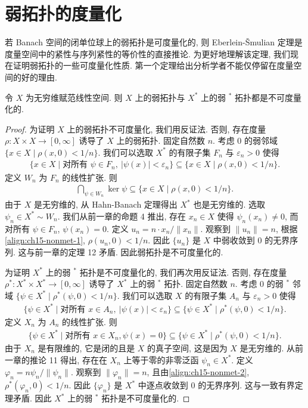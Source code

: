 \documentclass[../../main.tex]{subfiles}
\begin{document}
\section{弱拓扑的度量化}\label{section:ch15-metrizability}

若 Banach 空间的闭单位球上的弱拓扑是可度量化的, 则 Eberlein-\v{S}mulian 定理是度量空间中的紧性与序列紧性的等价性的直接推论. 为更好地理解该定理, 我们现在证明弱拓扑的一些可度量化性质. 第一个定理给出分析学者不能仅停留在度量空间的好的理由.

\begin{theorem}\label{theorem:ch15-nonmetrizable}
令 $X$ 为无穷维赋范线性空间. 则 $X$ 上的弱拓扑与 $X^{*}$ 上的弱 $^{*}$ 拓扑都是不可度量化的.
\end{theorem}

\begin{proof}
为证明 $X$ 上的弱拓扑不可度量化, 我们用反证法. 否则, 存在度量 $\rho:X\times X\to[0,\infty]$ 诱导了 $X$ 上的弱拓扑. 固定自然数 $n$. 考虑 $0$ 的弱邻域 $\{x\in X\mid\rho(x,0)<1/n\}$. 我们可以选取 $X^{*}$ 的有限子集 $F_{n}$ 与 $\varepsilon_{n}>0$ 使得
\begin{align*}
\{x\in X\mid\text{对所有 }\psi\in F_{n},\ |\psi(x)|<\varepsilon_{n}\}\subseteq\{x\in X\mid\rho(x,0)<1/n\}.
\end{align*}
定义 $W_{n}$ 为 $F_{n}$ 的线性扩张. 则
\begin{align}
\bigcap_{\psi\in W_{n}}\ker\psi\subseteq\{x\in X\mid\rho(x,0)<1/n\}.\label{align:ch15-nonmet-1}
\end{align}
由于 $X$ 是无穷维的, 从 Hahn-Banach 定理得出 $X^{*}$ 也是无穷维的. 选取 $\psi_{n}\in X^{*}\sim W_{n}$. 我们从前一章的命题 4 推出, 存在 $x_{n}\in X$ 使得 $\psi_{n}(x_{n})\neq 0$, 而对所有 $\psi\in F_{n}$, $\psi(x_{n})=0$. 定义 $u_{n}=n\cdot x_{n}/\|x_{n}\|$. 观察到 $\|u_{n}\|=n$, 根据\eqref{align:ch15-nonmet-1}, $\rho(u_{n},0)<1/n$. 因此 $\{u_{n}\}$ 是 $X$ 中弱收敛到 $0$ 的无界序列. 这与前一章的定理 12 矛盾. 因此弱拓扑是不可度量化的.

为证明 $X^{*}$ 上的弱 $^{*}$ 拓扑是不可度量化的, 我们再次用反证法. 否则, 存在度量 $\rho^{*}:X^{*}\times X^{*}\to[0,\infty]$ 诱导了 $X^{*}$ 上的弱 $^{*}$ 拓扑. 固定自然数 $n$. 考虑 $0$ 的弱 $^{*}$ 邻域 $\{\psi\in X^{*}\mid\rho^{*}(\psi,0)<1/n\}$. 我们可以选取 $X$ 的有限子集 $A_{n}$ 与 $\varepsilon_{n}>0$ 使得
\begin{align*}
\{\psi\in X^{*}\mid\text{对所有 }x\in A_{n},\ |\psi(x)|<\varepsilon_{n}\}\subseteq\{\psi\in X^{*}\mid\rho^{*}(\psi,0)<1/n\}.
\end{align*}
定义 $X_{n}$ 为 $A_{n}$ 的线性扩张. 则
\begin{align}
\{\psi\in X^{*}\mid\text{对所有 }x\in X_{n},\psi(x)=0\}\subseteq\{\psi\in X^{*}\mid\rho^{*}(\psi,0)<1/n\}.\label{align:ch15-nonmet-2}
\end{align}
由于 $X_{n}$ 是有限维的, 它是闭的且是 $X$ 的真子空间, 这是因为 $X$ 是无穷维的. 从前一章的推论 11 得出, 存在在 $X_{n}$ 上等于零的非零泛函 $\psi_{n}\in X^{*}$. 定义 $\varphi_{n}=n\psi_{n}/\|\psi_{n}\|$. 观察到 $\|\varphi_{n}\|=n$, 且由\eqref{align:ch15-nonmet-2}, $\rho^{*}(\varphi_{n},0)<1/n$. 因此 $\{\varphi_{n}\}$ 是 $X^{*}$ 中逐点收敛到 $0$ 的无界序列. 这与一致有界定理矛盾. 因此 $X^{*}$ 上的弱 $^{*}$ 拓扑是不可度量化的.
\end{proof}
\end{document}
